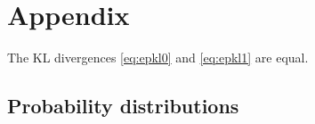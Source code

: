 \section{Appendix}

\begin{prop}\label{pr:kleq}
  The KL divergences \eqref{eq:epkl0} and \eqref{eq:epkl1} are equal.
\end{prop}

%

\subsection{Probability distributions}

